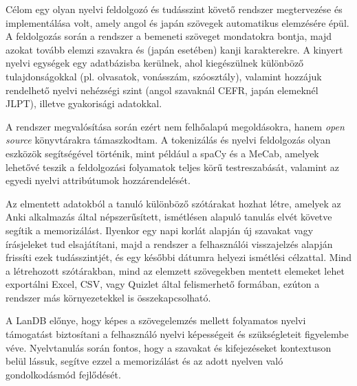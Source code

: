 Célom egy olyan nyelvi feldolgozó és tudásszint követő rendszer megtervezése és implementálása volt, amely angol és japán szövegek automatikus elemzésére épül. A feldolgozás során a rendszer a bemeneti szöveget mondatokra bontja, majd azokat tovább elemzi szavakra és (japán esetében) kanji karakterekre. A kinyert nyelvi egységek egy adatbázisba kerülnek, ahol kiegészülnek különböző tulajdonságokkal (pl. olvasatok, vonásszám, szóosztály), valamint hozzájuk rendelhető nyelvi nehézségi szint (angol szavaknál CEFR, japán elemeknél JLPT), illetve gyakorisági adatokkal.

A rendszer megvalósítása során ezért nem felhőalapú megoldásokra, hanem \textit{open source} könyvtárakra támaszkodtam. A tokenizálás és nyelvi feldolgozás olyan eszközök segítségével történik, mint például a spaCy és a MeCab, amelyek lehetővé teszik a feldolgozási folyamatok teljes körű testreszabását, valamint az egyedi nyelvi attribútumok hozzárendelését.

Az elmentett adatokból a tanuló különböző szótárakat hozhat létre, amelyek az Anki alkalmazás által népszerűsített, ismétlésen alapuló tanulás elvét követve segítik a memorizálást. Ilyenkor egy napi korlát alapján új szavakat vagy írásjeleket tud elsajátítani, majd a rendszer a felhasználói visszajelzés alapján frissíti ezek tudásszintjét, és egy későbbi dátumra helyezi ismétlési célzattal. Mind a létrehozott szótárakban, mind az elemzett szövegekben mentett elemeket lehet exportálni Excel, CSV, vagy Quizlet által felismerhető formában, ezúton a rendszer más környezetekkel is összekapcsolható.

A LanDB előnye, hogy képes a szövegelemzés mellett folyamatos nyelvi támogatást biztosítani a felhasználó nyelvi képességeit és szükségleteit figyelembe véve. Nyelvtanulás során fontos, hogy a szavakat és kifejezéseket kontextuson belül lássuk, segítve ezzel a memorizálást és az adott nyelven való gondolkodásmód fejlődését.
